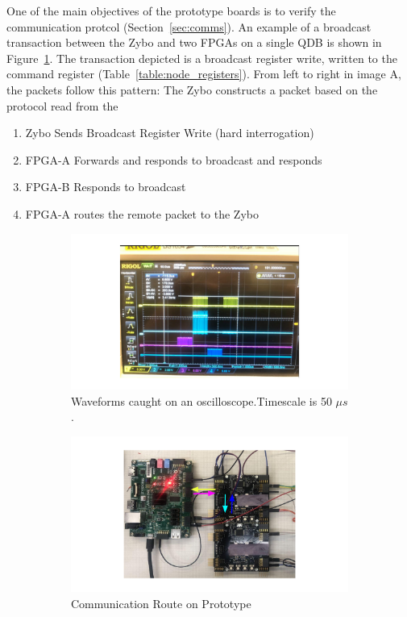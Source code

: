 One of the main objectives of the prototype boards is to verify the communication protcol (Section~\ref{sec:comms}).
An example of a broadcast transaction between the Zybo and two FPGAs on a single QDB is shown in Figure~\ref{fig:example_broadcast}.
The transaction depicted is a broadcast register write, written to the command register (Table~\ref{table:node_registers}).
From left to right in image A, the packets follow this pattern:
The Zybo constructs a packet based on the protocol read from the 

\begin{enumerate}
  \item Zybo Sends Broadcast Register Write (hard interrogation)
  \item FPGA-A Forwards and responds to broadcast and responds
  \item FPGA-B Responds to broadcast 
  \item FPGA-A routes the remote packet to the Zybo
\end{enumerate}

\begin{figure}
\centering
\begin{subfigure}{\textwidth}
  \centering
  \includegraphics[width=\textwidth]{images/qdb_example_packet_waveform.pdf}
  \caption{Waveforms caught on an oscilloscope.\newline Timescale is 50 $\unit{\mu s}$.}
\end{subfigure}%
\begin{subfigure}{\textwidth}
  \centering
  \includegraphics[width=\textwidth]{images/qdb_example_packet_waveform_diagram.pdf}
  \caption{Communication Route on Prototype}
\end{subfigure}
\caption{}
\label{fig:example_broadcast}
\end{figure}

